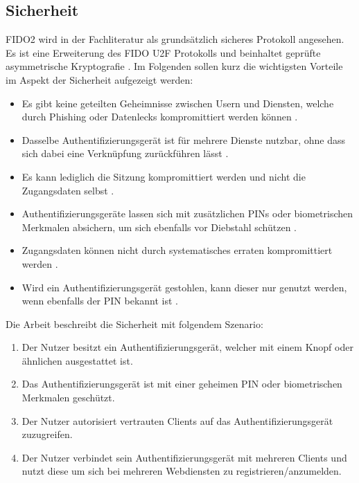 \subsection{Sicherheit}

\ac{FIDO}2 wird in der Fachliteratur als grundsätzlich sicheres Protokoll angesehen. Es ist eine Erweiterung des \ac{FIDO} \ac{U2F} Protokolls und beinhaltet geprüfte asymmetrische Kryptografie \cite{lyastani2020fido2} \cite{farke2020you}. Im Folgenden sollen kurz die wichtigsten Vorteile im Aspekt der Sicherheit aufgezeigt werden:


\begin{itemize}
    \item Es gibt keine geteilten Geheimnisse zwischen Usern und Diensten, welche durch Phishing oder Datenlecks kompromittiert werden können \cite{farke2020you} \cite{lyastani2020fido2}. 
    \item Dasselbe Authentifizierungsgerät ist für mehrere Dienste nutzbar, ohne dass sich dabei eine Verknüpfung zurückführen lässt \cite{lyastani2020fido2} \cite{farke2020you}.
    \item Es kann lediglich die Sitzung kompromittiert werden und nicht die Zugangsdaten selbst \cite{morii2017research}.
    \item Authentifizierungsgeräte lassen sich mit zusätzlichen PINs oder biometrischen Merkmalen absichern, um sich ebenfalls vor Diebstahl schützen \cite{barbosa2021provable}.
    \item Zugangsdaten können nicht durch systematisches erraten kompromittiert werden \cite{barbosa2021provable}.
    \item Wird ein Authentifizierungsgerät gestohlen, kann dieser nur genutzt werden, wenn ebenfalls der PIN bekannt ist \cite{barbosa2021provable}.
\end{itemize}

Die Arbeit \cite{barbosa2021provable} beschreibt die Sicherheit mit folgendem Szenario:

\begin{enumerate}
    \item Der Nutzer besitzt ein Authentifizierungsgerät, welcher mit einem Knopf oder ähnlichen ausgestattet ist.
    \item Das Authentifizierungsgerät ist mit einer geheimen PIN oder biometrischen Merkmalen geschützt.
    \item Der Nutzer autorisiert vertrauten Clients auf das Authentifizierungsgerät zuzugreifen.
    \item Der Nutzer verbindet sein Authentifizierungsgerät mit mehreren Clients und nutzt diese um sich bei mehreren Webdiensten zu registrieren/anzumelden.
\end{enumerate}

